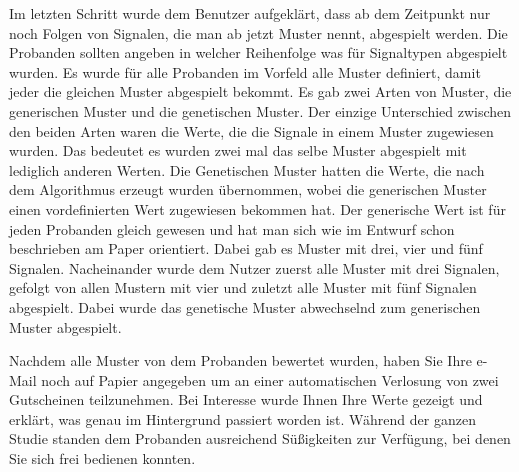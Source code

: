 Im letzten Schritt wurde dem Benutzer aufgekl{\"a}rt, dass ab dem Zeitpunkt nur noch Folgen von Signalen, die man ab jetzt Muster nennt, abgespielt werden.
Die Probanden sollten angeben in welcher Reihenfolge was f{\"u}r Signaltypen abgespielt wurden. 
Es wurde f{\"u}r alle Probanden im Vorfeld alle Muster definiert, damit jeder die gleichen Muster abgespielt bekommt. 
Es gab zwei Arten von Muster, die generischen Muster und die genetischen Muster. 
Der einzige Unterschied zwischen den beiden Arten waren die Werte, die die Signale in einem Muster zugewiesen wurden. 
Das bedeutet es wurden zwei mal das selbe Muster abgespielt mit lediglich anderen Werten. 
Die Genetischen Muster hatten die Werte, die nach dem Algorithmus erzeugt wurden {\"u}bernommen, wobei die generischen Muster einen vordefinierten Wert zugewiesen bekommen hat. 
Der generische Wert ist f{\"u}r jeden Probanden gleich gewesen und hat man sich wie im Entwurf schon beschrieben am Paper \cite{pescara2016ruttelflug} orientiert.
Dabei gab es Muster mit drei, vier und f{\"u}nf Signalen. 
Nacheinander wurde dem Nutzer zuerst alle Muster mit drei Signalen, gefolgt von allen Mustern mit vier und zuletzt alle Muster mit f{\"u}nf Signalen abgespielt. 
Dabei wurde das genetische Muster abwechselnd zum generischen Muster abgespielt. 

Nachdem alle Muster von dem Probanden bewertet wurden, haben Sie Ihre e-Mail noch auf Papier angegeben um an einer automatischen Verlosung von zwei Gutscheinen teilzunehmen. 
Bei Interesse wurde Ihnen Ihre Werte gezeigt und erkl{\"a}rt, was genau im Hintergrund passiert worden ist. 
W{\"a}hrend der ganzen Studie standen dem Probanden ausreichend S{\"u}{\ss}igkeiten zur Verf{\"u}gung, bei denen Sie sich frei bedienen konnten.

